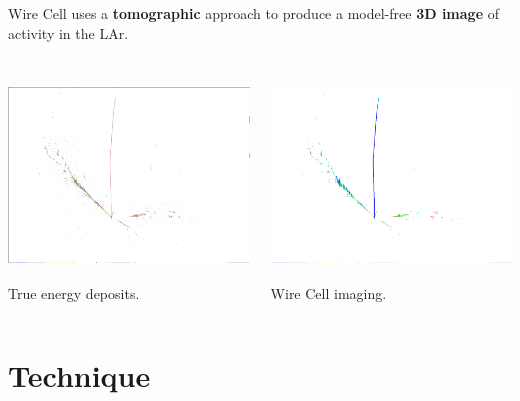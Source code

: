 \documentclass[xcolor=dvipsnames]{beamer}
\begin{document}
\begin{frame}[fragile]
  Wire Cell uses a \textbf{tomographic} approach to produce a
  model-free \textbf{3D image} of activity in the LAr.

  \vfill

  \begin{columns}

    \begin{column}{0.5\textwidth}
      \begin{center}
        \includegraphics[trim=1cm 2cm 1cm 1mm, clip, height=55mm]{bee-true.png}\\
        True energy deposits.
      \end{center}
    \end{column}

    \begin{column}{0.5\textwidth}
      \begin{center}
        \includegraphics[trim=1cm 2cm 1cm 1mm, clip, height=55mm]{bee-reco.png}\\
        Wire Cell imaging.
      \end{center}
      
    \end{column}
  \end{columns}

  \vfill

\end{frame}


\section{Technique}
\end{document}
